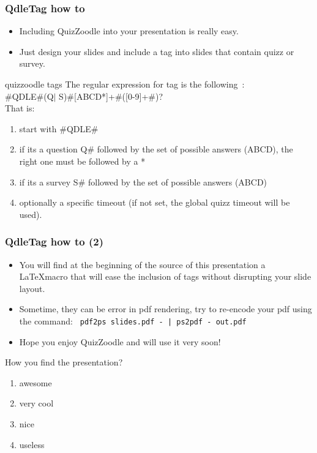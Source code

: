 \documentclass[serif]{beamer}
\begin{document}
\begin{frame}[fragile]
\frametitle{QdleTag how to}
\begin{itemize}
\item Including QuizZoodle into your presentation is really easy.
\item Just design your slides and include a tag into slides that contain
quizz or survey.
\end{itemize}
\pause
\begin{block}{quizzoodle tags}
The regular expression for tag is the following~:\\
\#QDLE\#(Q$|$ S)\#[ABCD*]+\#([0-9]+\#)?\\
That is:
\begin{enumerate}[1]
\item start with \#QDLE\#
\item if its a question Q\# followed by the set of possible answers (ABCD), the right one must be followed by a *
\item if its a survey S\# followed by the set of possible answers (ABCD)
\item optionally a specific timeout (if not set, the global quizz timeout will be used).
\end{enumerate}
\end{block}
\end{frame}

\begin{frame}[fragile]
\frametitle{QdleTag how to (2)}
\begin{itemize}
\item You will find at the beginning of the source of this presentation a \LaTeX macro that will ease the inclusion of tags without disrupting your slide layout.
\item Sometime, they can be error in pdf rendering, try to re-encode your pdf using the command: \verb+ pdf2ps slides.pdf - | ps2pdf - out.pdf +
\item Hope you enjoy QuizZoodle and will use it very soon!
\end{itemize}
\pause
\begin{block}{How you find the presentation?}
\begin{enumerate}
\item awesome
\item very cool
\item nice
\item useless
\end{enumerate}
\end{block}
\end{frame}
\end{document}
